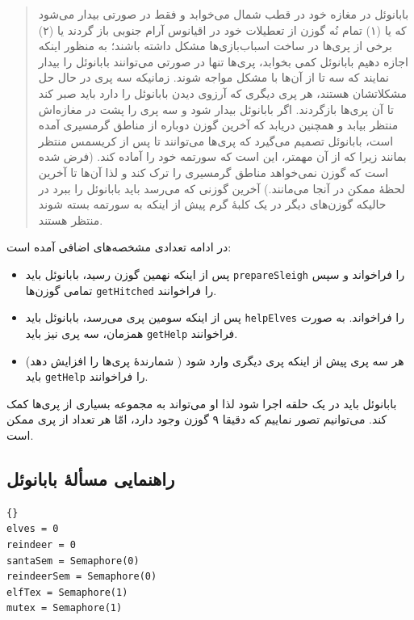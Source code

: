 \documentclass{book}
\newcommand{\clearemptydoublepage}{}%
\begin{document}
\begin{quotation}
    بابانوئل در مغازه خود در قطب شمال می‌خوابد و فقط در صورتی بیدار می‌شود که یا (۱) تمام نُه گوزن از تعطیلات خود در اقیانوس آرام جنوبی باز گردند یا (۲)
    برخی از پری‌ها در ساخت اسباب‌بازی‌ها مشکل داشته باشند؛ به منظور اینکه اجازه دهیم بابانوئل کمی بخوابد، پری‌ها تنها در صورتی می‌توانند 
    بابانوئل را بیدار نمایند که سه تا از آن‌ها با مشکل مواجه شوند. زمانیکه سه پری در حال حل مشکلاتشان هستند،‌ هر پری دیگری که آرزوی دیدن بابانوئل را دارد 
    باید صبر کند تا آن پری‌ها بازگردند. اگر بابانوئل بیدار شود و سه پری را پشت در مغازه‌اش منتظر بیابد و همچنین دریابد که آخرین گوزن دوباره  از مناطق 
    گرمسیری آمده است، بابانوئل تصمیم می‌گیرد که پری‌ها می‌توانند تا پس از کریسمس منتظر بمانند زیرا که از آن مهمتر، این است که سورتمه خود را آماده کند. 
    (فرض شده است که گوزن نمی‌خواهد مناطق گرمسیری را ترک کند و لذا آن‌ها تا آخرین لحظهٔ ممکن در آنجا می‌مانند.)
    آخرین گوزنی که می‌رسد باید بابانوئل را ببرد در حالیکه گوزن‌های دیگر در یک کلبهٔ گرم پیش از اینکه به سورتمه بسته شوند منتظر هستند. 
\end{quotation}

    در ادامه تعدادی مشخصه‌های اضافی آمده است: 

\begin {itemize}

\item 
    پس از اینکه نهمین گوزن رسید، بابانوئل باید {\tt prepareSleigh} را فراخواند و سپس تمامی گوزن‌ها  {\tt getHitched} را فراخوانند. 

\item 
    پس از اینکه سومین پری می‌رسد، بابانوئل باید  {\tt helpElves} را فراخواند. به صورت همزمان، سه پری نیز باید {\tt getHelp} فراخوانند. 

\item 
    هر سه پری پیش از اینکه پری دیگری وارد شود ( شمارندهٔ پری‌ها را افزایش دهد) باید {\tt getHelp} را فراخوانند.

\end {itemize}

    بابانوئل باید در یک حلقه اجرا شود لذا او می‌تواند به مجموعه بسیاری از پری‌ها کمک کند. می‌توانیم تصور نماییم که دقیقا ۹ گوزن وجود دارد، امّا 
    هر تعداد از پری ممکن است. 

\clearemptydoublepage
\subsection {راهنمایی مسألهٔ بابانوئل}

\begin{latin}
\begin{lstlisting}[title=\rl{راهنمایی مسأله بابانوئل}]{}
elves = 0
reindeer = 0
santaSem = Semaphore(0)
reindeerSem = Semaphore(0)
elfTex = Semaphore(1)
mutex = Semaphore(1)
\end{lstlisting}
\end{latin}
\end{document}
